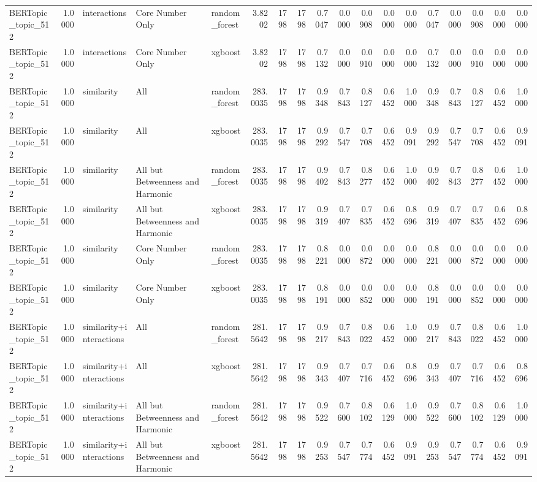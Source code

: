 \begin{tabular}{lrlllrrrrrrrrrrrrr}
BERTopic_topic_512 & 1.0000 & interactions & Core Number Only & random_forest & 3.8202 & 1798 & 1798 & 0.7047 & 0.0000 & 0.0908 & 0.0000 & 0.0000 & 0.7047 & 0.0000 & 0.0908 & 0.0000 & 0.0000 \\
BERTopic_topic_512 & 1.0000 & interactions & Core Number Only & xgboost & 3.8202 & 1798 & 1798 & 0.7132 & 0.0000 & 0.0910 & 0.0000 & 0.0000 & 0.7132 & 0.0000 & 0.0910 & 0.0000 & 0.0000 \\
BERTopic_topic_512 & 1.0000 & similarity & All & random_forest & 283.0035 & 1798 & 1798 & 0.9348 & 0.7843 & 0.8127 & 0.6452 & 1.0000 & 0.9348 & 0.7843 & 0.8127 & 0.6452 & 1.0000 \\
BERTopic_topic_512 & 1.0000 & similarity & All & xgboost & 283.0035 & 1798 & 1798 & 0.9292 & 0.7547 & 0.7708 & 0.6452 & 0.9091 & 0.9292 & 0.7547 & 0.7708 & 0.6452 & 0.9091 \\
BERTopic_topic_512 & 1.0000 & similarity & All but Betweenness and Harmonic & random_forest & 283.0035 & 1798 & 1798 & 0.9402 & 0.7843 & 0.8277 & 0.6452 & 1.0000 & 0.9402 & 0.7843 & 0.8277 & 0.6452 & 1.0000 \\
BERTopic_topic_512 & 1.0000 & similarity & All but Betweenness and Harmonic & xgboost & 283.0035 & 1798 & 1798 & 0.9319 & 0.7407 & 0.7835 & 0.6452 & 0.8696 & 0.9319 & 0.7407 & 0.7835 & 0.6452 & 0.8696 \\
BERTopic_topic_512 & 1.0000 & similarity & Core Number Only & random_forest & 283.0035 & 1798 & 1798 & 0.8221 & 0.0000 & 0.0872 & 0.0000 & 0.0000 & 0.8221 & 0.0000 & 0.0872 & 0.0000 & 0.0000 \\
BERTopic_topic_512 & 1.0000 & similarity & Core Number Only & xgboost & 283.0035 & 1798 & 1798 & 0.8191 & 0.0000 & 0.0852 & 0.0000 & 0.0000 & 0.8191 & 0.0000 & 0.0852 & 0.0000 & 0.0000 \\
BERTopic_topic_512 & 1.0000 & similarity+interactions & All & random_forest & 281.5642 & 1798 & 1798 & 0.9217 & 0.7843 & 0.8022 & 0.6452 & 1.0000 & 0.9217 & 0.7843 & 0.8022 & 0.6452 & 1.0000 \\
BERTopic_topic_512 & 1.0000 & similarity+interactions & All & xgboost & 281.5642 & 1798 & 1798 & 0.9343 & 0.7407 & 0.7716 & 0.6452 & 0.8696 & 0.9343 & 0.7407 & 0.7716 & 0.6452 & 0.8696 \\
BERTopic_topic_512 & 1.0000 & similarity+interactions & All but Betweenness and Harmonic & random_forest & 281.5642 & 1798 & 1798 & 0.9522 & 0.7600 & 0.8102 & 0.6129 & 1.0000 & 0.9522 & 0.7600 & 0.8102 & 0.6129 & 1.0000 \\
BERTopic_topic_512 & 1.0000 & similarity+interactions & All but Betweenness and Harmonic & xgboost & 281.5642 & 1798 & 1798 & 0.9253 & 0.7547 & 0.7774 & 0.6452 & 0.9091 & 0.9253 & 0.7547 & 0.7774 & 0.6452 & 0.9091 \\

\end{tabular}
